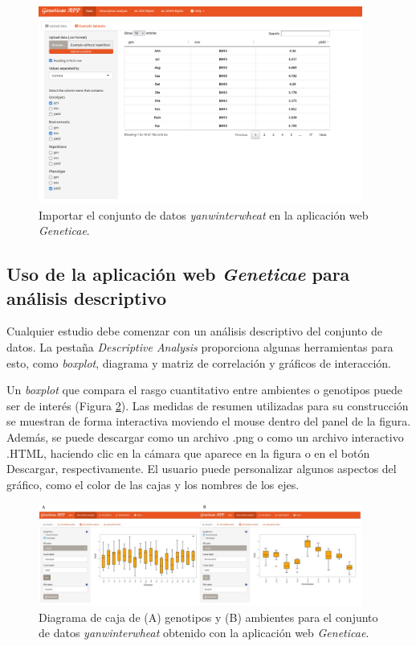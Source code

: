  \begin{figure}[h]
	\begin{center}
		\includegraphics[width=0.95\textwidth]{./Graficos/www/Data.png}
	\end{center}
	\caption{Importar el conjunto de datos \emph{yanwinterwheat} en la aplicación web \emph{Geneticae}.}
	\label{fig:fig431}
\end{figure}


\subsection{Uso de la aplicación web \emph{Geneticae} para análisis descriptivo}

Cualquier estudio debe comenzar con un análisis descriptivo del conjunto de datos. La pestaña \emph{Descriptive Analysis} proporciona algunas herramientas para esto, como  \emph{boxplot}, diagrama y matriz de correlación y gráficos de interacción.

Un \emph{boxplot} que compara el rasgo cuantitativo entre ambientes o genotipos puede ser de interés (Figura \ref{fig:figdesc1}). Las medidas de resumen utilizadas para su construcción se muestran de forma interactiva moviendo el mouse dentro del panel de la figura. Además, se puede descargar como un archivo .png o como un archivo interactivo .HTML, haciendo clic en la cámara que aparece en la figura o en el botón Descargar, respectivamente. El usuario puede personalizar algunos aspectos del gráfico, como el color de las cajas y los nombres de los ejes. 

\begin{figure}[H]
	\begin{center}
		\includegraphics[width=0.95\textwidth]{./Graficos/Boxplot.jpg}
	\end{center}
	\caption{Diagrama de caja de (A) genotipos y (B) ambientes para el conjunto de datos \emph{yanwinterwheat} obtenido con la aplicación web \emph{Geneticae}.}
	\label{fig:figdesc1}
\end{figure}

